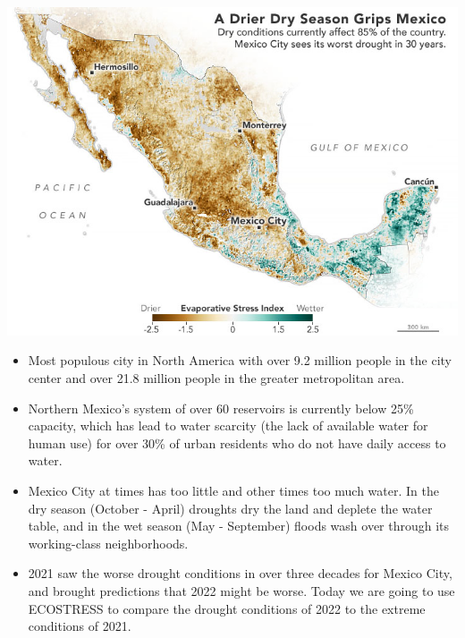 \documentclass[oneside,a4paper,11pt,explicit]{book}
\begin{document}



\begin{tcolorbox}[colback=yellow!5!white,colframe=IceCreamLeaf,title=\textbf{Mexico City}]
	\begin{multicols}{2}

	\centerline{\includegraphics[width=\columnwidth]{mexico_esi_2021.png}}

	\columnbreak
		\begin{itemize}
			\item Most populous city in North America with over 9.2 million people in the city center and over 21.8 million people in the greater metropolitan area. 
			\item Northern Mexico's system of over 60 reservoirs is currently below 25\% capacity, which has lead to water scarcity (the lack of available water for human use) for over 30\% of urban residents who do not have daily access to water.
		\end{itemize}
	\end{multicols}

	\begin{itemize}
		\item Mexico City at times has too little and other times too much water. In the dry season (October - April) droughts dry the land and deplete the water table, and in the wet season (May - September) floods wash over through its working-class neighborhoods.
		\item 2021 saw the worse drought conditions in over three decades for Mexico City, and brought predictions that 2022 might be worse. Today we are going to use ECOSTRESS to compare the drought conditions of 2022 to the extreme conditions of 2021.
	\end{itemize}

\end{tcolorbox}
\end{document}
